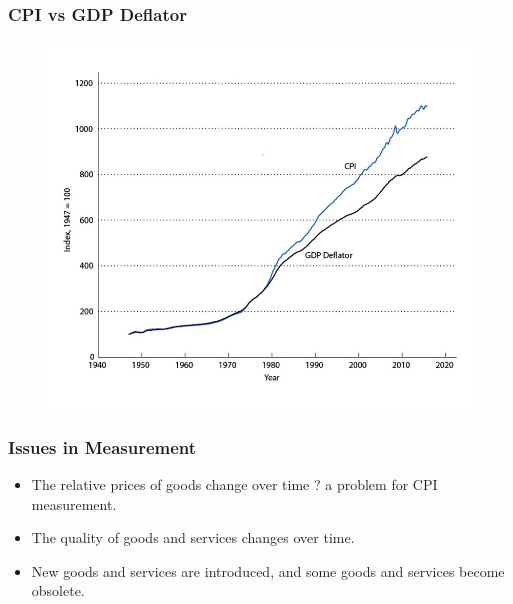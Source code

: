 \documentclass{beamer}
\begin{document}
\begin{frame}
\frametitle[alignment=center]{CPI vs GDP Deflator}
\begin{figure}
\includegraphics[scale=0.6]{Figures/W_Fig_2pt3.png}
\end{figure}
\end{frame}

    \begin{frame}
\frametitle[alignment=center]{Issues in Measurement}
\begin{itemize}
\item The relative prices of goods change over time ? a problem for CPI measurement.
\bigskip
\item The quality of goods and services changes over time.
\bigskip
\item New goods and services are introduced, and some goods and services become obsolete.
\end{itemize}
\end{frame}
\end{document}
